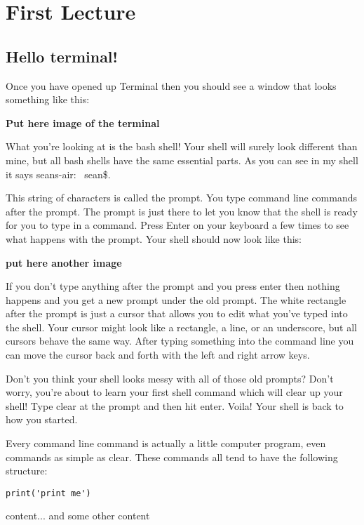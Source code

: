 \chapter{First Lecture}

\section{Hello terminal!}
Once you have opened up Terminal then you should see a window that looks something like this:

\textbf{Put here image of the terminal}

What you’re looking at is the bash shell! Your shell will surely look different than mine, but all bash shells have the same essential parts. As you can see in my shell it says seans-air:~ sean\$.
 
This string of characters is called the prompt. You type command line commands after the prompt. The prompt is just there to let you know that the shell is ready for you to type in a command. Press Enter on your keyboard a few times to see what happens with the prompt. Your shell should now look like this:

\textbf{put here another image}

If you don’t type anything after the prompt and you press enter then nothing happens and you get a new prompt under the old prompt. The white rectangle after the prompt is just a cursor that allows you to edit what you’ve typed into the shell. Your cursor might look like a rectangle, a line, or an underscore, but all cursors behave the same way. After typing something into the command line you can move the cursor back and forth with the left and right arrow keys.

Don’t you think your shell looks messy with all of those old prompts? Don’t worry, you’re about to learn your first shell command which will clear up your shell! Type clear at the prompt and then hit enter. Voila! Your shell is back to how you started.

Every command line command is actually a little computer program, even commands as simple as clear. These commands all tend to have the following structure:

\begin{lstlisting}
print('print me')
\end{lstlisting}


\begin{commandshell}
	content...
	and some other content
\end{commandshell}



